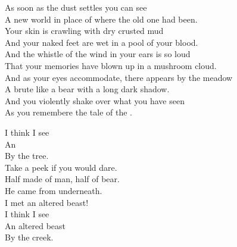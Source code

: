 
\label{album:murder-of-the-universe}





As soon as the dust settles you can see \\
A new world in place of where the old one had been. \\

Your skin is crawling with dry crusted mud \\
And your naked feet are wet in a pool of your blood. \\

And the whistle of the wind in your ears is so loud \\
That your memories have blown up in a mushroom cloud. \\

And as your eyes accommodate, there appears by the meadow \\
A brute like a bear with a long dark shadow. \\

And you violently shake over what you have seen \\
As you remembere the tale of the . \\





I think I see \\
An  \\
By the tree. \\

Take a peek if you would dare. \\
Half made of man, half of bear. \\

He came from underneath. \\
I met an altered beast! \\

I think I see \\
An altered beast \\
By the creek. \\

